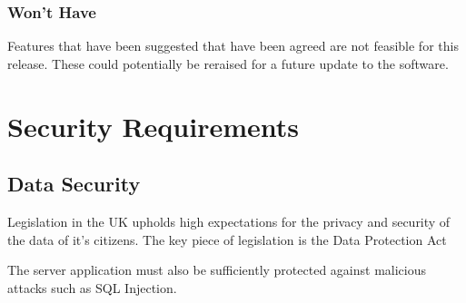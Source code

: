 \subsubsection{Won't Have}
Features that have been suggested that have been agreed are not feasible for this release.
These could potentially be reraised for a future update to the software.

\section{Security Requirements}
\subsection{Data Security}
Legislation in the UK upholds high expectations for the privacy and security of the data of it's citizens. 
The key piece of legislation is the Data Protection Act \citep{britain_data_1984}

The server application must also be sufficiently protected against malicious attacks such as SQL Injection.